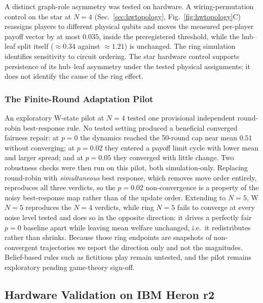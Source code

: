 \documentclass[conference,letterpaper,10pt]{IEEEtran}
\begin{document}
A distinct graph-role asymmetry was tested on hardware. A wiring-permutation control on
the star at $N=4$ (Sec.~\ref{sec:hwtopology},
Fig.~\ref{fig:hwtopology}C) reassigns players to different physical qubits and
moves the measured per-player payoff vector by at most $0.035$, inside the
preregistered threshold, while the hub--leaf split itself
($\approx 0.34$ against $\approx 1.21$) is unchanged. The ring simulation identifies sensitivity to circuit ordering. The star
hardware control supports persistence of its hub--leaf asymmetry under the
tested physical assignments; it does not identify the cause of the ring effect.

\subsubsection{The Finite-Round Adaptation Pilot}
An exploratory W-state pilot at $N=4$ tested one provisional independent
round-robin best-response rule. No tested setting produced a beneficial
converged fairness repair: at $p=0$ the dynamics reached the 50-round cap
near mean $0.51$ without converging; at $p=0.02$ they entered a payoff limit
cycle with lower mean and larger spread; and at $p=0.05$ they converged with
little change. Two robustness checks were then run on this pilot, both
simulation-only. Replacing round-robin with \emph{simultaneous} best response,
which removes move order entirely, reproduces all three verdicts, so the
$p=0.02$ non-convergence is a property of the noisy best-response map rather
than of the update order. Extending to $N=5$, W $N=5$ reproduces the
$N=4$ verdicts, while ring $N=5$ fails to converge at every noise level
tested and does so in the opposite direction: it drives a perfectly fair
$p=0$ baseline apart while leaving mean welfare unchanged, i.e.\ it
redistributes rather than shrinks. Because those ring endpoints are snapshots of
non-convergent trajectories we report the direction only and not the magnitudes.
Belief-based rules such as fictitious play remain untested, and the pilot
remains exploratory pending game-theory sign-off.



\subsection{Hardware Validation on IBM Heron r2}\label{sec:hardware}
\end{document}
